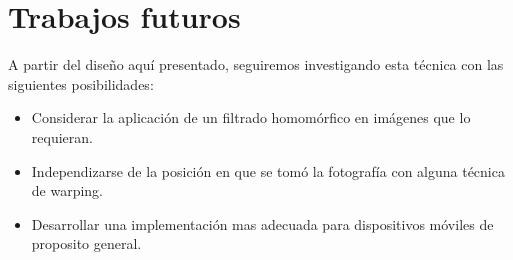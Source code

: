 \documentclass[conference,spanish,a4paper,10pt,oneside,final]{tfmpd}
\begin{document}
\section{Trabajos futuros}
A partir del diseño aquí presentado, seguiremos investigando esta técnica con las siguientes
posibilidades:
\begin{itemize}
\item Considerar la aplicación de un filtrado homomórfico en imágenes que lo requieran.
\item Independizarse de la posición en que se tomó la fotografía con alguna técnica de warping.
\item Desarrollar una implementación mas adecuada para dispositivos móviles de
proposito general.\end{itemize}

\nocite{*}


\end{document}
